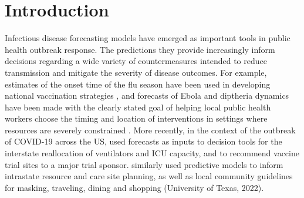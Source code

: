 \documentclass{article}
\begin{document}
\section{Introduction}

Infectious disease forecasting models have emerged as important tools in public health outbreak response. The
predictions they provide increasingly inform decisions regarding a wide variety of countermeasures intended to reduce
transmission and mitigate the severity of disease outcomes. For example, estimates of the onset time of the flu season
have been used in developing national vaccination strategies \citep{igboh2023timing}, and forecasts of Ebola and
diptheria dynamics have been made with the clearly stated goal of helping local public health workers choose the timing
and location of interventions in settings where resources are severely constrained 
\citep{meltzer2014estimating, rainisch2015regional, camacho2015-ebola-bed,finger_real-time_2019}. More recently, in the
context of the outbreak of COVID-19 across the US, \cite{bertsimas2021predictionsCOVID} used forecasts as inputs to
decision tools for the interstate reallocation of ventilators and ICU capacity, and to recommend vaccine trial sites to
a major trial sponsor. \cite{fox_real-time_2022} similarly used predictive models to inform intrastate resource and
care site planning, as well as local community guidelines for masking, traveling, dining and shopping (University of
Texas, 2022)\nocite{utnews2022}.
\end{document}

